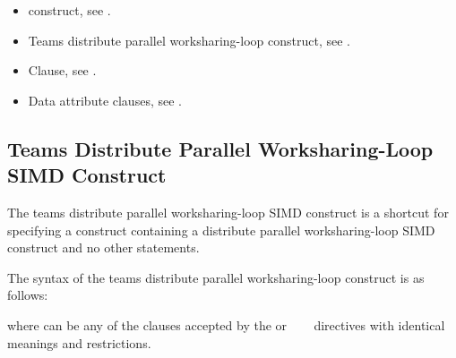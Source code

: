 \crossreferences
\begin{itemize}
\item {} construct, see .

\item Teams distribute parallel worksharing-loop construct, see
      .

\item {} Clause, see .

\item Data attribute clauses, see
      .
\end{itemize}










\subsection{Teams Distribute Parallel Worksharing-Loop SIMD Construct}
\label{subsec:Teams Distribute Parallel Worksharing-Loop SIMD Construct}
\summary
The teams distribute parallel worksharing-loop SIMD construct is a shortcut for specifying a 
construct containing a distribute parallel worksharing-loop SIMD construct and no other statements.

\syntax
\begin{ccppspecific}
The syntax of the teams distribute parallel worksharing-loop construct is as follows:

\begin{ompcPragma}[fontsize=\small]
#pragma omp teams distribute parallel for simd \plc{\}
            \plc{[clause[ [},\plc{] clause] ... ] new-line}
    \plc{for-loops}
\end{ompcPragma}

where  can be any of the clauses accepted by the  or
~~~
directives with identical meanings and restrictions.
\end{ccppspecific}

